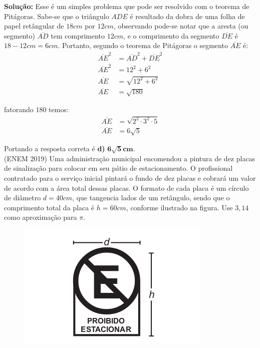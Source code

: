 \begin{multicols*}{2}
    \noindent \textbf{Solução:} 
    Esse é um simples problema que pode ser resolvido com o teorema de Pitágoras.
    Sabe-se que o triângulo $ADE$ é resultado da dobra de uma folha de papel retângular
    de $18 cm$ por $12 cm$, observando pode-se notar que a aresta (ou segmento) 
    $\overline{AD}$ tem comprimento $12cm$, e o comprimento da segmento $\overline{DE}$
    é $18-12 cm = 6cm$. Portanto, segundo o teorema de Pitágoras o segmento 
    $\overline{AE}$ é:
    \begin{align}
        \overline{AE}^2 &= \overline{AD}^2 + \overline{DE}^2\\
        \overline{AE}^2 &= 12^2 + 6^2\\
        \overline{AE} &= \sqrt{12^2+6^2}\\
        \overline{AE} &= \sqrt{180}
    \end{align}
    
    \noindent fatorando $180$ temos:
    \begin{align}
        \overline{AE} &= \sqrt{2^2\cdot 3^2\cdot 5}\\
        \overline{AE} &= 6\sqrt{5}
    \end{align}

    \noindent Portando a resposta correta é \textbf{d)} $\mathbf{6\sqrt{5}cm}$.\\


    \noindent 
    \execnum (ENEM 2019) Uma administração municipal encomendou a pintura
    de dez placas de sinalização para colocar em seu pátio
    de estacionamento.
    O profissional contratado para o serviço inicial
    pintará o fundo de dez placas e cobrará um valor de
    acordo com a área total dessas placas. O formato
    de cada placa é um círculo de diâmetro $d = 40 cm$,
    que tangencia lados de um retângulo, sendo que
    o comprimento total da placa é $h = 60 cm$, conforme
    ilustrado na figura. Use $3,14$ como aproximação para $\pi$.

    \begin{figure}[H]
        \includegraphics[width=\columnwidth]{assets/enem2019-151.png}
    \end{figure}


\end{multicols*}
